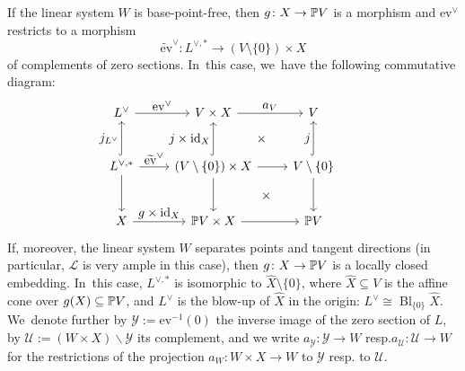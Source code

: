 \documentclass[11pt]{article}
\newcommand{\resp}{resp.\xspace}
\let\ts\textstyle
\newcommand{\ev}{\mathrm{ev}}
\newcommand{\Ell}{\mathscr{L}}
\newcommand{\cU}{\mathcal{U}}\let\mcu\cU
\newcommand{\cY}{\mathcal{Y}}\let\mcy\cY
\DeclareMathOperator{\id}{\textup{id}}
\begin{document}
If the linear system $W$ is base-point-free, then $g \colon X \to \P V$ is a morphism and $\ev^\vee$ restricts to a morphism
\[
\widetilde{\ev}^{\vee} \colon L^{\vee,*} \to (V \setminus \{0\}) \times X
\]
of complements of zero sections. In~this case, we~have the following commutative diagram:
\[
\begin{tikzcd}[row sep=large]
L^\vee \ar{r}{\ts \ev^\vee} & V \times X \ar{r}{\ts a_V} \ar[phantom]{dr}{\times} & V\\
L^{\vee,*} \ar{r}{\ts \widetilde{\ev}^{\vee}} \ar{d} \ar[hook]{u}{\ts j_{L^\vee}} & (V \setminus \{0\}) \times X \ar{d} \ar[hook]{u}{\ts j \times \id_X} \ar{r}
\ar[phantom]{dr}{\times}
& V \setminus \{0\} \ar{d} \ar[hook]{u}{\ts j} \\
X \ar{r}{\ts g \times \id_X} & \P V \times X \ar{r} & \P V&
\end{tikzcd}
\]
If, moreover, the linear system $W$ separates points and tangent directions (in particular, $\Ell$ is very ample in this case), then $g \colon X \to \P V$ is a locally closed embedding. In~this case, $L^{\vee,*}$ is isomorphic to $\hat{X} \setminus \{0\}$, where $\hat{X} \subseteq V$ is the affine cone over $g(X) \subseteq \P V$, and $L^\vee$ is the blow-up of $\hat X$ in the origin: $L^\vee \cong \operatorname{Bl}_{\{0\}}\hat{X}$. We~denote further by $\cY:=\ev^{-1}(0)$ the inverse image of the zero section of $L$, by $\cU:=(W \times X)\backslash \cY$ its complement, and we write $a_\cY:\cY\to W$ \resp $a_\cU:\cU\to W$ for the restrictions of the
projection $a_W \colon W\times X \to W$ to $\cY$ \resp to $\cU$.
\end{document}
